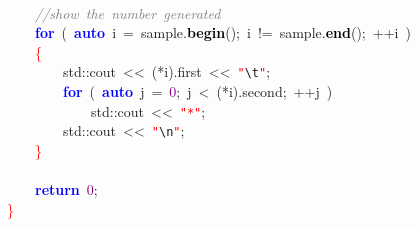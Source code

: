 \mbox{} \\
\mbox{}\ \ \ \ \textit{\textcolor{Gray}{//show\ the\ number\ generated}} \\
\mbox{}\ \ \ \ \textbf{\textcolor{Blue}{for}}\ \textcolor{BrickRed}{(}\ \textbf{\textcolor{Blue}{auto}}\ i\ \textcolor{BrickRed}{=}\ sample\textcolor{BrickRed}{.}\textbf{\textcolor{Black}{begin}}\textcolor{BrickRed}{();}\ i\ \textcolor{BrickRed}{!=}\ sample\textcolor{BrickRed}{.}\textbf{\textcolor{Black}{end}}\textcolor{BrickRed}{();}\ \textcolor{BrickRed}{++}i\ \textcolor{BrickRed}{)} \\
\mbox{}\ \ \ \ \textcolor{Red}{\{} \\
\mbox{}\ \ \ \ \ \ \ \ std\textcolor{BrickRed}{::}cout\ \textcolor{BrickRed}{\textless{}\textless{}}\ \textcolor{BrickRed}{(*}i\textcolor{BrickRed}{).}first\ \textcolor{BrickRed}{\textless{}\textless{}}\ \texttt{\textcolor{Red}{"{}}}\texttt{\textcolor{CarnationPink}{\textbackslash{}t}}\texttt{\textcolor{Red}{"{}}}\textcolor{BrickRed}{;} \\
\mbox{}\ \ \ \ \ \ \ \ \textbf{\textcolor{Blue}{for}}\ \textcolor{BrickRed}{(}\ \textbf{\textcolor{Blue}{auto}}\ j\ \textcolor{BrickRed}{=}\ \textcolor{Purple}{0}\textcolor{BrickRed}{;}\ j\ \textcolor{BrickRed}{\textless{}}\ \textcolor{BrickRed}{(*}i\textcolor{BrickRed}{).}second\textcolor{BrickRed}{;}\ \textcolor{BrickRed}{++}j\ \textcolor{BrickRed}{)} \\
\mbox{}\ \ \ \ \ \ \ \ \ \ \ \ std\textcolor{BrickRed}{::}cout\ \textcolor{BrickRed}{\textless{}\textless{}}\ \texttt{\textcolor{Red}{"{}*"{}}}\textcolor{BrickRed}{;} \\
\mbox{}\ \ \ \ \ \ \ \ std\textcolor{BrickRed}{::}cout\ \textcolor{BrickRed}{\textless{}\textless{}}\ \texttt{\textcolor{Red}{"{}}}\texttt{\textcolor{CarnationPink}{\textbackslash{}n}}\texttt{\textcolor{Red}{"{}}}\textcolor{BrickRed}{;} \\
\mbox{}\ \ \ \ \textcolor{Red}{\}} \\
\mbox{} \\
\mbox{}\ \ \ \ \textbf{\textcolor{Blue}{return}}\ \textcolor{Purple}{0}\textcolor{BrickRed}{;} \\
\mbox{}\textcolor{Red}{\}} \\
\mbox{} \\
\mbox{}









